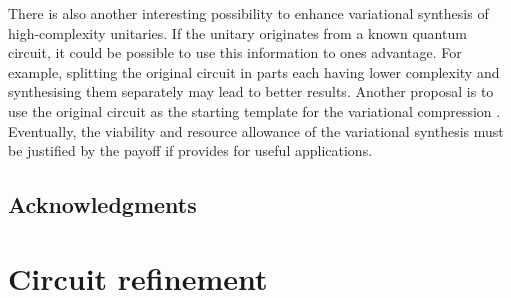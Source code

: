 \documentclass[twocolumn, amsfonts, amssymb, aps, nofootinbib]{revtex4-2}
\begin{document}
There is also another interesting possibility to enhance variational synthesis of high-complexity unitaries. If the unitary originates from a known quantum circuit, it could be possible to use this information to ones advantage. For example, splitting the original circuit in parts each having lower complexity and synthesising them separately may lead to better results. Another proposal is to use the original circuit as the starting template for the variational compression \cite{Rakyta2022}. Eventually, the viability and resource allowance of the variational synthesis must be justified by the payoff if provides for useful applications.


\subsection*{Acknowledgments}


\appendix
\section{Circuit refinement \label{app exact}}
\end{document}
